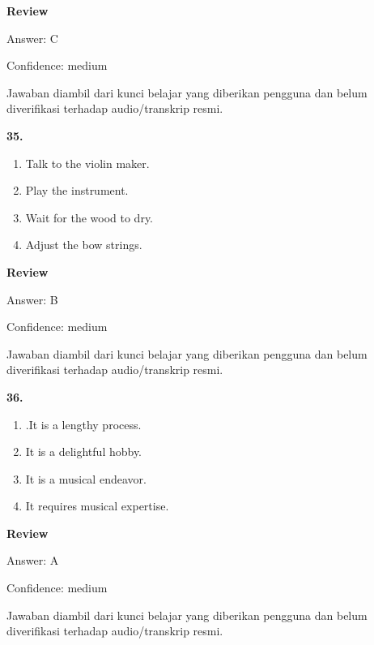 \documentclass[12pt]{article}
\begin{document}
\par
\begingroup
\setlength{\parskip}{0pt}
\setlength{\parindent}{0pt}
\textbf{Review}\par
Answer: C\par
Confidence: medium\par
Jawaban diambil dari kunci belajar yang diberikan pengguna dan belum diverifikasi terhadap audio/transkrip resmi.\par
\endgroup
\par
\vspace{0.25\baselineskip}
\noindent\textbf{35.}
\begin{enumerate}[label=(\Alph*),leftmargin=*,itemsep=0.2em]
\item Talk to the violin maker.
\item Play the instrument.
\item Wait for the wood to dry.
\item Adjust the bow strings.
\end{enumerate}
\par
\begingroup
\setlength{\parskip}{0pt}
\setlength{\parindent}{0pt}
\textbf{Review}\par
Answer: B\par
Confidence: medium\par
Jawaban diambil dari kunci belajar yang diberikan pengguna dan belum diverifikasi terhadap audio/transkrip resmi.\par
\endgroup
\par
\vspace{0.25\baselineskip}
\noindent\textbf{36.}
\begin{enumerate}[label=(\Alph*),leftmargin=*,itemsep=0.2em]
\item .It is a lengthy process.
\item It is a delightful hobby.
\item It is a musical endeavor.
\item It requires musical expertise.
\end{enumerate}
\par
\begingroup
\setlength{\parskip}{0pt}
\setlength{\parindent}{0pt}
\textbf{Review}\par
Answer: A\par
Confidence: medium\par
Jawaban diambil dari kunci belajar yang diberikan pengguna dan belum diverifikasi terhadap audio/transkrip resmi.\par
\endgroup
\par
\vspace{0.25\baselineskip}
\end{document}

